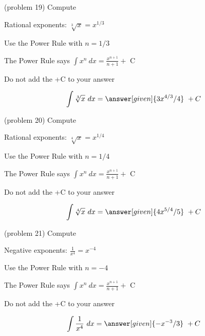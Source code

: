 \documentclass[handout]{ximera}
\begin{document}
\begin{problem}(problem 19)
Compute 

\begin{hint}
Rational exponents: $\sqrt[3]x = x^{1/3}$
\end{hint}
\begin{hint}
Use the Power Rule with $n=1/3$
\end{hint}
\begin{hint}
The Power Rule says $\int x^n \ dx = \frac{x^{n+1}}{n+1} +$ C
\end{hint}
\begin{hint}
\begin{center}
Do not add the +C to your answer
\end{center}
\end{hint}

\[
\int \sqrt[3]x \ dx =
\answer[given]{3x^{4/3} /4} \ + C
\]
\end{problem}


\begin{problem}(problem 20)
Compute 

\begin{hint}
Rational exponents: $\sqrt[4]x = x^{1/4}$
\end{hint}
\begin{hint}
Use the Power Rule with $n=1/4$
\end{hint}
\begin{hint}
The Power Rule says $\int x^n \ dx = \frac{x^{n+1}}{n+1} +$ C
\end{hint}
\begin{hint}
\begin{center}
Do not add the +C to your answer
\end{center}
\end{hint}

\[
\int \sqrt[4]x \ dx =
\answer[given]{4x^{5/4} /5} \ + C
\]
\end{problem}




\begin{problem}(problem 21)
Compute 

\begin{hint}
Negative exponents: $\frac{1}{x^4} = x^{-4}$
\end{hint}
\begin{hint}
Use the Power Rule with $n=-4$
\end{hint}
\begin{hint}
The Power Rule says $\int x^n \ dx = \frac{x^{n+1}}{n+1} +$ C
\end{hint}
\begin{hint}
\begin{center}
Do not add the +C to your answer
\end{center}
\end{hint}

\[
\int \frac{1}{x^4} \ dx =
\answer[given]{-x^{-3} /3} \ + C
\]
\end{problem}
\end{document}
